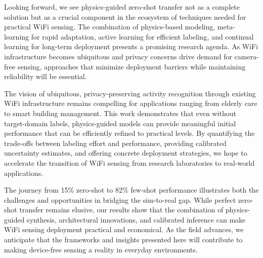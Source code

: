 \documentclass[journal]{IEEEtran}
\begin{document}
Looking forward, we see physics-guided zero-shot transfer not as a complete solution but as a crucial component in the ecosystem of techniques needed for practical WiFi sensing. The combination of physics-based modeling, meta-learning for rapid adaptation, active learning for efficient labeling, and continual learning for long-term deployment presents a promising research agenda. As WiFi infrastructure becomes ubiquitous and privacy concerns drive demand for camera-free sensing, approaches that minimize deployment barriers while maintaining reliability will be essential.

The vision of ubiquitous, privacy-preserving activity recognition through existing WiFi infrastructure remains compelling for applications ranging from elderly care to smart building management. This work demonstrates that even without target-domain labels, physics-guided models can provide meaningful initial performance that can be efficiently refined to practical levels. By quantifying the trade-offs between labeling effort and performance, providing calibrated uncertainty estimates, and offering concrete deployment strategies, we hope to accelerate the transition of WiFi sensing from research laboratories to real-world applications.

The journey from 15\% zero-shot to 82\% few-shot performance illustrates both the challenges and opportunities in bridging the sim-to-real gap. While perfect zero-shot transfer remains elusive, our results show that the combination of physics-guided synthesis, architectural innovations, and calibrated inference can make WiFi sensing deployment practical and economical. As the field advances, we anticipate that the frameworks and insights presented here will contribute to making device-free sensing a reality in everyday environments.



\end{document}

